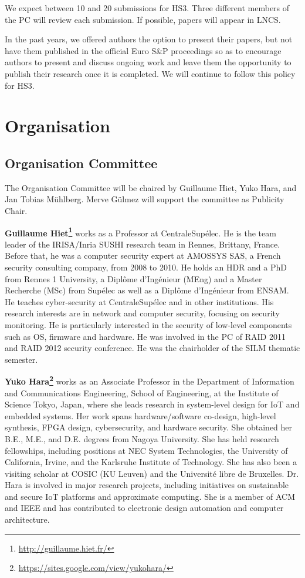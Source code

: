 \documentclass[a4paper,11pt]{article}
\begin{document}
We expect between 10 and 20 submissions for HS3. Three different members of the PC will review each submission.  If
possible, papers will appear in LNCS.

In the past years, we offered authors the option to present their papers, but
not have them published in the official Euro S\&P proceedings so as to
encourage authors to present and discuss ongoing work and leave them the
opportunity to publish their research once it is completed. We will continue to follow
this policy for HS3.


\section{Organisation}
%
\subsection{Organisation Committee}
%
The Organisation Committee will be chaired by Guillaume Hiet, Yuko Hara, and Jan Tobias
M\"uhlberg. Merve G\"ulmez will support the committee as Publicity Chair.

\textbf{Guillaume Hiet\footnote{\url{http://guillaume.hiet.fr/}}} works as a
Professor at CentraleSupélec. He is the team leader of the IRISA/Inria SUSHI research
team in Rennes, Brittany, France. Before that, he was a computer security
expert at AMOSSYS SAS, a French security consulting company, from 2008 to
2010. He holds an HDR and a PhD from Rennes 1 University, a Diplôme d'Ingénieur (MEng)
and a Master Recherche (MSc) from Supélec as well as a Diplôme d'Ingénieur
from ENSAM. He teaches cyber-security at CentraleSupélec and in other
institutions. His research interests are in network and computer security,
focusing on security monitoring. He is particularly interested in the
security of low-level components such as OS, firmware and hardware. He was
involved in the PC of RAID 2011 and RAID 2012 security conference. He was
the chairholder of the SILM thematic semester.

\textbf{Yuko Hara\footnote{\url{https://sites.google.com/view/yukohara/}}}  works as an Associate Professor in the Department of Information and Communications Engineering, School of Engineering, at the Institute of Science Tokyo, Japan, where she leads research in system-level design for IoT and embedded systems. Her work spans hardware/software co-design, high-level synthesis, FPGA design, cybersecurity, and hardware security.
She obtained her B.E., M.E., and D.E. degrees from Nagoya University. She has held research fellowships, including positions at NEC System Technologies, the University of California, Irvine, and the Karlsruhe Institute of Technology. She has also been a visiting scholar at COSIC (KU Leuven) and the Université libre de Bruxelles.
Dr. Hara is involved in major research projects, including initiatives on sustainable and secure IoT platforms and approximate computing. She is a member of ACM and IEEE and has contributed to electronic design automation and computer architecture.
\end{document}
